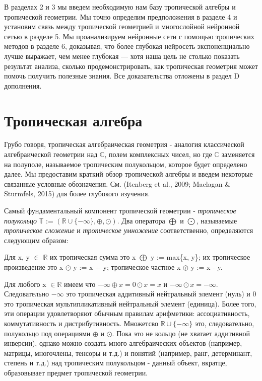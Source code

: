 \documentclass[russian]{lecture-notes}
\begin{document}
	В разделах 2 и 3 мы введем необходимую нам базу тропической алгебры и тропической геометрии. Мы точно определим предположения в разделе 4 и установим связь между тропической геометрией и многослойной нейронной сетью в разделе 5. Мы проанализируем нейронные сети с помощью тропических методов в разделе 6, доказывая, что более глубокая нейросеть экспоненциально лучше выражает, чем менее глубокая --- хотя наша цель не столько показать результат анализа, сколько продемонстрировать, как тропическая геометрия может помочь получить полезные знания. Все доказательства отложены в раздел D дополнения.
	
	\section{Тропическая алгебра}
	
	Грубо говоря, тропическая алгебраическая геометрия - аналогия классической алгебраической геометрии над $\mathbb{C}$, полем комплексных чисел, но где $\mathbb{C}$ заменяется на полуполе, называемое тропическим полукольцом, которое будет определено далее. Мы предоставим краткий обзор тропической алгебры и введем некоторые связанные условные обозначения. См. (Itenberg et al., 2009; Maclagan \& Sturmfels,
	2015) для более глубокого изучения.
	
	Самый фундаментальный компонент тропической геометрии - \textit{тропическое полукольцо} $\mathbb{T}$ := $ (\mathbb{R} \cup \{- \infty \}, \oplus, \odot)$. Два оператора $\bigoplus$ и $\bigodot$, называемые \textit{тропическое сложение} и \textit{тропическое умножение} соответственно, определяются следующим образом:
	
	\begin{Definition}
		Для x, y $\in $ $ \mathbb{R}$ их тропическая сумма это x $\bigoplus$ y := max\{x, y\}; их тропическое произведение это x $\odot$ y := x + y; тропическое частное x $\oslash$ y := x - y.
	\end{Definition}
	
	Для любого x $\in \mathbb{R}$ имеем что $- \infty \oplus x = 0 \odot x = x$ и $- \infty \odot x = - \infty $. Следовательно $ - \infty$ это тропическая аддитивный нейтральный элемент (нуль) и 0 это тропическая мультипликативный нейтральный элемент (единица). Более того, эти операции удовлетворяют обычным правилам арифметики: ассоциативность, коммутативность и дистрибутивность. Множетсво $ \mathbb{R} \cup \{ - \infty\} $ это, следовательно, полукольцо под операциями $\oplus$ и $\odot$. Пока это не кольцо (не хватает аддитивной инверсии), однако можно создать много алгебраических объектов (например, матрицы, многочлены, тенсоры и т.д.) и понятий (например, ранг, детерминант, степень и т.д.) над тропическим полукольцом - данный объект, вкратце, образовывает предмет тропической геометрии.
	
\end{document}

